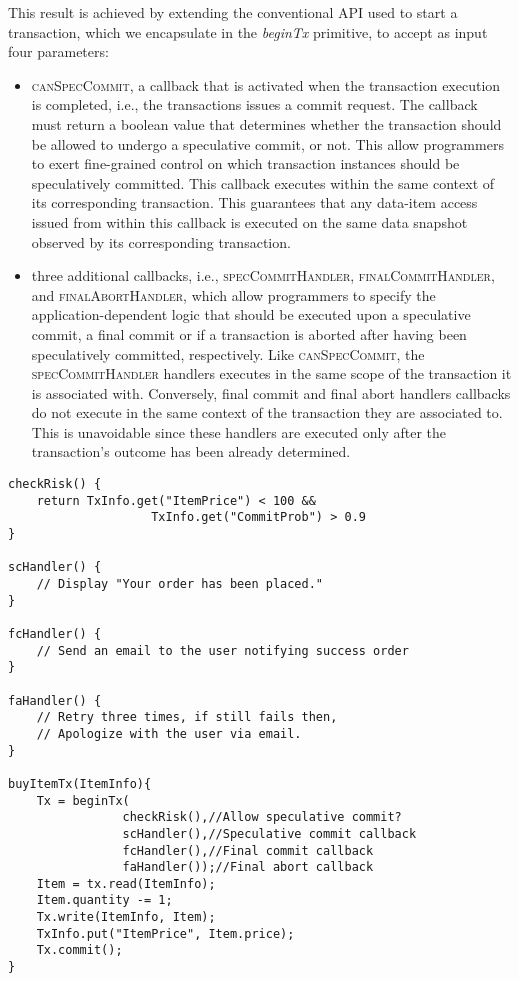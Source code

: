 This result is achieved by extending the conventional API used to start a transaction, which we encapsulate in the \textit{beginTx} primitive, to accept as input four parameters:
\begin{itemize}
\item \textsc{canSpecCommit}, a callback that is activated when the transaction execution is completed, i.e., the transactions issues a commit request. The callback must return a boolean value that determines whether the transaction should be allowed to undergo a speculative commit, or not. This allow programmers to exert fine-grained control on which transaction instances should be speculatively committed.  This callback executes within the same context of its corresponding transaction. This guarantees that any data-item access issued from within this callback is executed on the same data snapshot observed by its corresponding transaction. 
\item three additional callbacks, i.e., \textsc{specCommitHandler}, \textsc{finalCommitHandler}, and \textsc{finalAbortHandler},  which allow  programmers to specify the application-dependent logic that should be executed upon a speculative commit, a final commit or if a transaction is aborted after having been speculatively committed, respectively. Like \textsc{canSpecCommit}, the \textsc{specCommitHandler} handlers executes in the same  scope of the transaction it is associated with. Conversely, final commit and final abort handlers callbacks do not execute in the same context of the transaction they are associated to. This is unavoidable since these handlers are executed only after the transaction's outcome has been already determined. 
\end{itemize}



 
\begin{lstlisting}[caption=Use case of the proposed programming model.]   
checkRisk() { 
    return TxInfo.get("ItemPrice") < 100 &&
                    TxInfo.get("CommitProb") > 0.9
}

scHandler() {
    // Display "Your order has been placed."
}

fcHandler() {
    // Send an email to the user notifying success order
}

faHandler() {
    // Retry three times, if still fails then,
    // Apologize with the user via email.
}

buyItemTx(ItemInfo){
    Tx = beginTx(
                checkRisk(),//Allow speculative commit?
                scHandler(),//Speculative commit callback
                fcHandler(),//Final commit callback
                faHandler());//Final abort callback
    Item = tx.read(ItemInfo);
    Item.quantity -= 1;
    Tx.write(ItemInfo, Item);
    TxInfo.put("ItemPrice", Item.price);
    Tx.commit();
}
\end{lstlisting}


